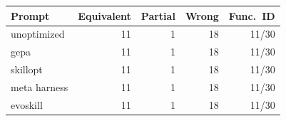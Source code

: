 \begin{tabular}{lrrrr}
\toprule
Prompt & Equivalent & Partial & Wrong & Func.\ ID \\
\midrule
unoptimized & 11 & 1 & 18 & 11/30 \\
gepa & 11 & 1 & 18 & 11/30 \\
skillopt & 11 & 1 & 18 & 11/30 \\
meta harness & 11 & 1 & 18 & 11/30 \\
evoskill & 11 & 1 & 18 & 11/30 \\
\bottomrule
\end{tabular}
